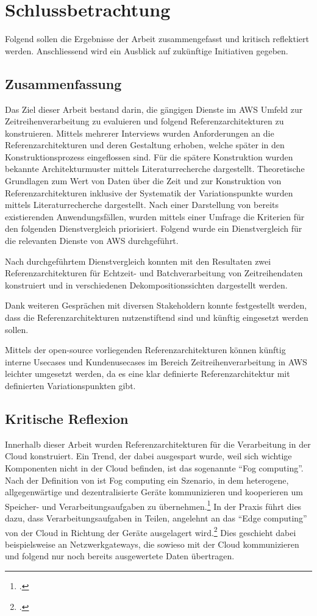 \chapter{Schlussbetrachtung}
Folgend sollen die Ergebnisse der Arbeit zusammengefasst und kritisch reflektiert werden. Anschliessend wird ein Ausblick auf zukünftige Initiativen gegeben.
\section{Zusammenfassung}
Das Ziel dieser Arbeit bestand darin, die gängigen Dienste im \ac{AWS} Umfeld zur Zeitreihenverarbeitung zu evaluieren und folgend Referenzarchitekturen zu konstruieren. Mittels mehrerer Interviews wurden Anforderungen an die Referenzarchitekturen und deren Gestaltung erhoben, welche später in den Konstruktionsprozess eingeflossen sind. 
Für die spätere Konstruktion wurden bekannte Architekturmuster mittels Literaturrecherche dargestellt. Theoretische Grundlagen zum Wert von Daten über die Zeit und zur Konstruktion von Referenzarchitekturen inklusive der Systematik der Variationspunkte wurden mittels Literaturrecherche dargestellt. Nach einer Darstellung von bereits existierenden Anwendungsfällen, wurden mittels einer Umfrage die Kriterien für den folgenden Dienstvergleich priorisiert. Folgend wurde ein Dienstvergleich für die relevanten Dienste von \ac{AWS} durchgeführt.

Nach durchgeführtem Dienstvergleich konnten mit den Resultaten zwei Referenzarchitekturen für Echtzeit- und Batchverarbeitung von Zeitreihendaten konstruiert und in verschiedenen Dekompositionssichten dargestellt werden.

Dank weiteren Gesprächen mit diversen Stakeholdern konnte festgestellt werden, dass die Referenzarchitekturen nutzenstiftend sind und künftig eingesetzt werden sollen.

Mittels der open-source vorliegenden Referenzarchitekturen können künftig interne Usecases und Kundenusecases im Bereich Zeitreihenverarbeitung in \ac{AWS} leichter umgesetzt werden, da es eine klar definierte Referenzarchitektur mit definierten Variationspunkten gibt.


\section{Kritische Reflexion}
Innerhalb dieser Arbeit wurden Referenzarchitekturen für die Verarbeitung in der Cloud konstruiert. Ein Trend, der dabei ausgespart wurde, weil sich wichtige Komponenten nicht in der Cloud befinden, ist das sogenannte \enquote{Fog computing}. Nach der Definition von \citeauthor{Vaquero.2014} ist Fog computing ein Szenario, in dem heterogene, allgegenwärtige und dezentralisierte Geräte kommunizieren und kooperieren um Speicher- und Verarbeitungsaufgaben zu übernehmen.\footcite[Vgl.][30\psq]{Vaquero.2014} In der Praxis führt dies dazu, dass Verarbeitungsaufgaben in Teilen, angelehnt an das \enquote{Edge computing} von der Cloud in Richtung der Geräte ausgelagert wird.\footcite[Vgl.][]{Bonomi.2012} Dies geschieht dabei beispielsweise an Netzwerkgateways, die sowieso mit der Cloud kommunizieren und folgend nur noch bereits ausgewertete Daten übertragen. 

